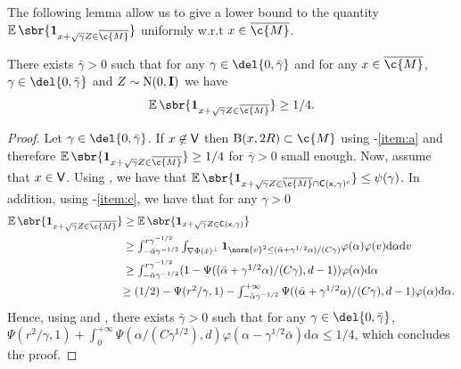 The following lemma allow us to give a lower bound to the quantity $\E\sbr{\bm{1}_{x+\sqrt{\gamma}Z \in \cl{\c{M}}}}$ uniformly w.r.t $x \in \cl{\c{M}}$.

\begin{lemma}
	\label{lemma:lower_bound_prob}
	There exists $\bar{\gamma} >0$ such that for any $\gamma \in \del{0, \bar{\gamma}}$ and for any $x \in \cl{\c{M}}$, $\gamma \in \del{0, \bar{\gamma}}$ and $Z \sim \mathrm{N}(0, \m{I})$ we have \begin{equation} \E\sbr{\bm{1}_{x + \sqrt{\gamma} Z \in \cl{\c{M}}}} \geq 1/4 .
	\end{equation}
\end{lemma}

\begin{proof}
	Let $\gamma \in \del{0, \bar{\gamma}}$.
	If $x \not \in \sf{V}$ then $\mathrm{B}(x,2R) \subset \c{M}$ using -\ref{item:a} and therefore $\E\sbr{\bm{1}_{x + \sqrt{\gamma} Z \in \cl{\c{M}}}} \geq 1/4$ for $\bar{\gamma} > 0$ small enough.
	Now, assume that $x \in \sf{V}$.
	Using , we have that $\E\sbr{\bm{1}_{x + \sqrt{\gamma} Z \in \cl{\c{M}}\cap \sf{C}(x, \gamma)^\mathrm{c}}} \leq \psi(\gamma)$.
	In addition, using -\ref{item:c}, we have that for any $\gamma >0$ \begin{align} \E\sbr{\bm{1}_{x + \sqrt{\gamma} Z \in \cl{\c{M}}}} & \geq \E\sbr{\bm{1}_{x + \sqrt{\gamma} Z \in \sf{C}(x, \gamma)}} \\ &\geq \textstyle{\int_{-\bar{\alpha} \gamma^{-1/2}}^{r \gamma^{-1/2}} \int_{\nabla \Phi(\bar{x})^\perp} \bm{1}_{\norm{v}^2\leq (\bar{\alpha}+\gamma^{1/2}\alpha)/(C\gamma)} \varphi(\alpha)\varphi(v) \mathrm{d} \alpha \mathrm{d} v} \\ &\geq \textstyle{\int_{-\bar{\alpha} \gamma^{-1/2}}^{r \gamma^{-1/2}} (1 - \Psi((\bar{\alpha}+\gamma^{1/2}\alpha)/(C\gamma),d-1)) \varphi(\alpha) \mathrm{d} \alpha} \\  & \textstyle{\geq (1/2) - \Psi(r^2/\gamma, 1) - \int_{-\bar{\alpha} \gamma^{-1/2}}^{+\infty} \Psi((\bar{\alpha}+\gamma^{1/2}\alpha)/(C\gamma),d-1) \varphi(\alpha) \mathrm{d} \alpha.
                 }
	\end{align}
	Hence, using  and , there exists $\bar{\gamma} >0$ such that for any $\gamma \in \del{0, \bar{\gamma}}$, $\Psi(r^2/\gamma, 1) + \int_0^{+\infty} \Psi(\alpha/(C\gamma^{1/2}),d) \varphi(\alpha-\gamma^{1/2}\bar{\alpha}) \mathrm{d} \alpha \leq 1/4$, which concludes the proof.
\end{proof}

